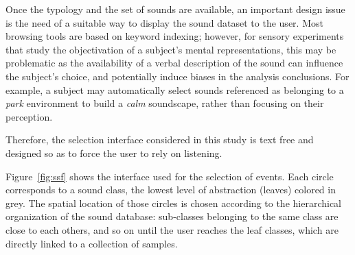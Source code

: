 \documentclass[12pt]{elsarticle}
\begin{document}
Once the typology and the set of sounds are available, an important design issue is the need of a suitable way to display the sound dataset to the user. Most browsing tools are based on keyword indexing; however, for sensory experiments that study the objectivation of a subject's mental representations, this may be problematic as the availability of a verbal description of the sound can influence the subject's choice, and potentially induce biases in the analysis conclusions. For example, a subject may automatically select sounds referenced as belonging to a \emph{park} environment to build a \emph{calm} soundscape, rather than focusing on their perception.


Therefore, the selection interface considered in this study is text free and designed so as to force the user to rely on listening.


Figure~\ref{fig:ssf} shows the interface used for the selection of events. Each circle corresponds to a sound class, the lowest level of abstraction (leaves) colored in grey. The spatial location of those circles is chosen according to the hierarchical organization of the sound database: sub-classes belonging to the same class are close to each others, and so on until the user reaches the leaf classes, which are directly linked to a collection of samples.

\end{document}
